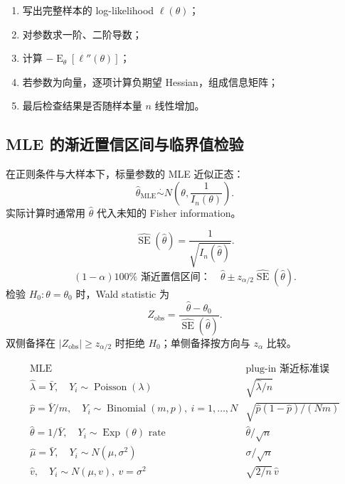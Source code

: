 \documentclass[11pt,a4paper]{article}
\theoremstyle{definition}
\theoremstyle{plain}
\theoremstyle{remark}
\newcommand{\E}{\operatorname{E}}
\newcommand{\se}{\operatorname{SE}}
\begin{document}
\begin{methodbox}
\begin{enumerate}
    \item 写出完整样本的 log-likelihood $\ell(\theta)$；
    \item 对参数求一阶、二阶导数；
    \item 计算 $-\E_\theta[\ell''(\theta)]$；
    \item 若参数为向量，逐项计算负期望 Hessian，组成信息矩阵；
    \item 最后检查结果是否随样本量 $n$ 线性增加。
\end{enumerate}
\end{methodbox}

\subsection{MLE 的渐近置信区间与临界值检验}

在正则条件与大样本下，标量参数的 MLE 近似正态：
\[
    \hat\theta_{\mathrm{MLE}}
    \overset{\cdot}{\sim}
    N\left(\theta,\frac{1}{I_n(\theta)}\right).
\]
实际计算时通常用 $\hat\theta$ 代入未知的 Fisher information。

\begin{memorybox}
\[
    \boxed{
    \widehat{\se}(\hat\theta)
    =
    \frac{1}{\sqrt{I_n(\hat\theta)}}.
    }
\]
\[
    \boxed{
    (1-\alpha)100\%\text{ 渐近置信区间：}\quad
    \hat\theta
    \pm
    z_{\alpha/2}\widehat{\se}(\hat\theta).
    }
\]
检验 $H_0:\theta=\theta_0$ 时，Wald statistic 为
\[
    \boxed{
    Z_{\mathrm{obs}}
    =
    \frac{\hat\theta-\theta_0}
    {\widehat{\se}(\hat\theta)}.
    }
\]
双侧备择在 $|Z_{\mathrm{obs}}|\ge z_{\alpha/2}$ 时拒绝 $H_0$；单侧备择按方向与 $z_\alpha$ 比较。
\end{memorybox}

\begin{memorybox}
\[
\boxed{
\begin{array}{c|c}
\text{MLE} & \text{plug-in 渐近标准误}\\
\hline
\hat\lambda=\bar Y,\quad Y_i\sim\operatorname{Poisson}(\lambda)
& \sqrt{\hat\lambda/n}\\[2pt]
\hat p=\bar Y/m,\quad Y_i\sim\operatorname{Binomial}(m,p),\ i=1,\ldots,N
& \sqrt{\hat p(1-\hat p)/(Nm)}\\[2pt]
\hat\theta=1/\bar Y,\quad Y_i\sim\operatorname{Exp}(\theta)\text{ rate}
& \hat\theta/\sqrt n\\[2pt]
\hat\mu=\bar Y,\quad Y_i\sim N(\mu,\sigma^2)
& \sigma/\sqrt n\\[2pt]
\hat v,\quad Y_i\sim N(\mu,v),\ v=\sigma^2
& \sqrt{2/n}\,\hat v
\end{array}
}
\]
\end{memorybox}
\end{document}
